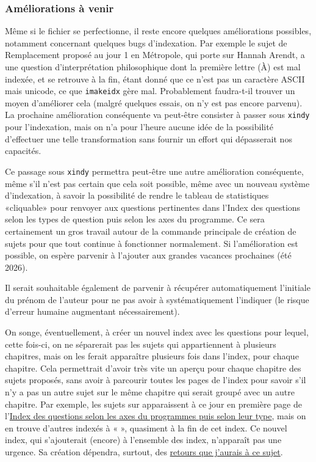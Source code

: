 \subsubsection{Améliorations à venir}

Même si le fichier se perfectionne, il reste encore quelques améliorations possibles, notamment concernant quelques bugs d'indexation. Par exemple le sujet de Remplacement proposé au jour 1 en Métropole, qui porte sur Hannah Arendt, a une question d'interprétation philosophique dont la première lettre (À) est mal indexée, et se retrouve à la fin, étant donné que ce n'est pas un caractère ASCII mais unicode, ce que \texttt{imakeidx} gère mal. Probablement faudra-t-il trouver un moyen d'améliorer cela (malgré quelques essais, on n'y est pas encore parvenu). La prochaine amélioration conséquente va peut-être consister à passer sous \texttt{xindy} pour l'indexation, mais on n'a pour l'heure aucune idée de la possibilité d'effectuer une telle transformation sans fournir un effort qui dépasserait nos capacités.

Ce passage sous \texttt{xindy} permettra peut-être une autre amélioration conséquente, même s'il n'est pas certain que cela soit possible, même avec un nouveau système d'indexation, à savoir la possibilité de rendre le tableau de statistiques «{}cliquable»{} pour renvoyer aux questions pertinentes dans l'Index des questions selon les types de question puis selon les axes du programme. Ce sera certainement un gros travail autour de la commande principale de création de sujets pour que tout continue à fonctionner normalement. Si l'amélioration est possible, on espère parvenir à l'ajouter aux grandes vacances prochaines (été 2026).

Il serait souhaitable également de parvenir à récupérer automatiquement l'initiale du prénom de l'auteur pour ne pas avoir à systématiquement l'indiquer (le risque d'erreur humaine augmentant nécessairement).

On songe, éventuellement, à créer un nouvel index avec les questions pour lequel, cette fois-ci, on ne séparerait pas les sujets qui appartiennent à plusieurs chapitres, mais on les ferait apparaître plusieurs fois dans l'index, pour chaque chapitre. Cela permettrait d'avoir très vite un aperçu pour chaque chapitre des sujets proposés, sans avoir à parcourir toutes les pages de l'index pour savoir s'il n'y a pas un autre sujet sur le même chapitre qui serait groupé avec un autre chapitre. Par exemple, les sujets sur \ETA{} apparaissent à ce jour en première page de l'\hyperlink{indexw}{Index des questions selon les axes du programmes puis selon leur type}, mais on en trouve d'autres indexés à « \EXSTA{} »{}, quasiment à la fin de cet index. Ce nouvel index, qui s'ajouterait (encore) à l'ensemble des index, n'apparaît pas une urgence. Sa création dépendra, surtout, des \href{mailto:mikael.quesseveur@ac-lille.fr}{retours que j'aurais à ce sujet}.

